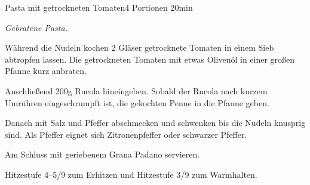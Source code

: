 \documentclass[../recipe-collections/cooking.tex]{subfiles}
\begin{document}
\begin{recipe}{Pasta mit getrockneten Tomaten}{4 Portionen }{20min }

  \freeform{}\textit{Gebratene Pasta.}


  Während die Nudeln kochen 2 Gläser getrocknete Tomaten in einem Sieb abtropfen lassen.
  Die getrockneten Tomaten mit etwas Olivenöl in einer großen Pfanne kurz anbraten.


  Anschließend 200g Rucola hineingeben.
  Sobald der Rucola nach kurzem Umrühren eingeschrumpft ist, die gekochten Penne in die Pfanne geben.


  Danach mit Salz und Pfeffer abschmecken und schwenken bis die Nudeln knusprig sind.
  Als Pfeffer eignet sich Zitronenpfeffer oder schwarzer Pfeffer.


  Am Schluss mit geriebenem Grana Padano servieren.

  \freeform{}\hrulefill{}

  \freeform{}
  Hitzestufe 4–5/9 zum Erhitzen und Hitzestufe 3/9 zum Warmhalten.

\end{recipe}
\end{document}
